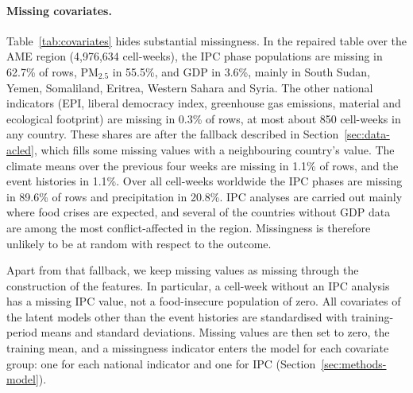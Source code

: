 \paragraph{Missing covariates.} Table~\ref{tab:covariates} hides substantial
missingness. In the repaired table over the AME region
(4{,}976{,}634 cell-weeks), the IPC phase populations are missing in 62.7\% of rows,
PM$_{2.5}$ in 55.5\%, and GDP in 3.6\%, mainly in South Sudan, Yemen,
Somaliland, Eritrea, Western Sahara and Syria. The other national indicators (EPI,
liberal democracy index, greenhouse gas emissions, material and ecological footprint)
are missing in 0.3\% of rows, at most about 850 cell-weeks in any country. These
shares are after the fallback described in Section~\ref{sec:data-acled}, which fills
some missing values with a neighbouring country's value. The
climate means over the previous four weeks are missing in 1.1\% of rows, and the event
histories in 1.1\%. Over all cell-weeks worldwide the IPC phases
are missing in 89.6\% of rows and precipitation in 20.8\%. IPC analyses are carried
out mainly where food crises are expected, and several of the countries without GDP
data are among the most conflict-affected in the region. Missingness is
therefore unlikely to be at random with respect to the outcome.

Apart from that fallback, we keep missing values as missing through the construction
of the features. In particular, a cell-week without an IPC analysis has a missing IPC value, not a
food-insecure population of zero. All covariates of the latent models other than the
event histories are standardised with training-period means and standard
deviations. Missing values are then set to zero, the training mean, and a
missingness indicator enters the model for each covariate group: one for each
national indicator and one for IPC (Section~\ref{sec:methods-model}).

